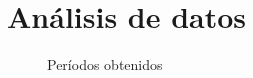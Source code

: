 \section{Análisis de datos}

\begin{figure}[H]
    \centering
    
    \caption{Períodos obtenidos}
\end{figure}
